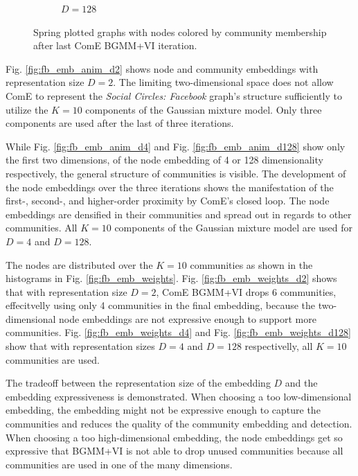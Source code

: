 \documentclass[conference]{IEEEtran}
\begin{document}
\begin{figure}[htbp]
\begin{subfigure}{.33\textwidth}
        \caption{$D=128$}
    \end{subfigure}%
    \caption{Spring plotted graphs with nodes colored by community membership after last ComE BGMM+VI iteration.}
    \label{fig:fb_graphs}
\end{figure}

Fig. \ref{fig:fb_emb_anim_d2} shows node and community embeddings with representation size $D=2$. The limiting two-dimensional space does not allow ComE to represent the \textit{Social Circles: Facebook} graph's structure sufficiently to utilize the $K=10$ components of the Gaussian mixture model. Only three components are used after the last of three iterations.

While Fig. \ref{fig:fb_emb_anim_d4} and Fig. \ref{fig:fb_emb_anim_d128} show only the first two dimensions, of the node embedding of 4 or 128 dimensionality respectively, the general structure of communities is visible. The development of the node embeddings over the three iterations shows the manifestation of the first-, second-, and higher-order proximity by ComE's closed loop. The node embeddings are densified in their communities and spread out in regards to other communities. All $K=10$ components of the Gaussian mixture model are used for $D=4$ and $D=128$.

The nodes are distributed over the $K=10$ communities as shown in the histograms in Fig. \ref{fig:fb_emb_weights}. Fig. \ref{fig:fb_emb_weights_d2} shows that with representation size $D=2$, ComE BGMM+VI drops 6 communities, effecitvelly using only 4 communities in the final embedding, because the two-dimensional node embeddings are not expressive enough to support more communities. Fig. \ref{fig:fb_emb_weights_d4} and Fig. \ref{fig:fb_emb_weights_d128} show that with representation sizes $D=4$ and $D=128$ respectivelly, all $K=10$ communities are used.

The tradeoff between the representation size of the embedding $D$ and the embedding expressiveness is demonstrated. When choosing a too low-dimensional embedding, the embedding might not be expressive enough to capture the communities and reduces the quality of the community embedding and detection. When choosing a too high-dimensional embedding, the node embeddings get so expressive that BGMM+VI is not able to drop unused communities because all communities are used in one of the many dimensions.
\end{document}
